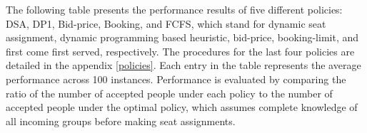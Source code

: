 


The following table presents the performance results of five different policies: DSA, DP1, Bid-price, Booking, and FCFS, which stand for dynamic seat assignment, dynamic programming based heuristic, bid-price, booking-limit, and first come first served, respectively. The procedures for the last four policies are detailed in the appendix \ref{policies}. Each entry in the table represents the average performance across 100 instances. Performance is evaluated by comparing the ratio of the number of accepted people under each policy to the number of accepted people under the optimal policy, which assumes complete knowledge of all incoming groups before making seat assignments.

